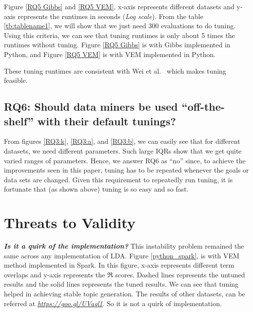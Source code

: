 \documentclass[10pt,conference]{IEEEtran}
\theoremstyle{break}
\begin{document}
Figure \ref{RQ5 Gibbs} and \ref{RQ5 VEM}, x-axis represents different datasets and y-axis represents the runtimes in seconds (\textit{Log scale}). From the table \ref{tb:tablename1}, we will show that we just need 300 evaluations to do tuning. Using this criteria, we can see that tuning runtimes is only about 5 times the runtimes without tuning. Figure \ref{RQ5 Gibbs} is with Gibbs implemented in Python, and Figure \ref{RQ5 VEM} is with VEM implemented in Python.

\begin{lesson}
These tuning runtimes are consistent with Wei et al.~\cite{fu2016tuning} which makes tuning feasible.
\end{lesson}

\subsection{\textbf{RQ6: Should data miners be used “off-the-shelf” with their  default  tunings?}}

From figures \ref{RQ3:k}, \ref{RQ3:a}, and \ref{RQ3:b}, we can easily see that for different datasets, we need different parameters. Such large IQRs show that we get quite varied ranges of parameters. Hence, we answer RQ6 as “no” since, to achieve the improvements seen in this paper, tuning has to be repeated whenever the goals or data sets are changed. Given this requirement to repeatedly run tuning, it is fortunate that (as shown above) tuning is so easy and so fast.

\section{Threats to Validity}
\label{sect: validity}

\textit{\textbf{Is it a quirk of the implementation?}} This instability problem remained the same across any implementation of LDA. Figure \ref{python_spark}, is with VEM method implemented in Spark. In this figure, x-axis represents different term overlaps and y-axis represents the $\Re$ scores. Dashed lines represents the untuned results and the solid lines represents the tuned results. We can see that tuning helped in achieving stable topic generation. The results of other datasets, can be referred at \href{https://goo.gl/UVaql1}{\textit{https://goo.gl/UVaql1}}. So it is not a quirk of implementation.
\end{document}
